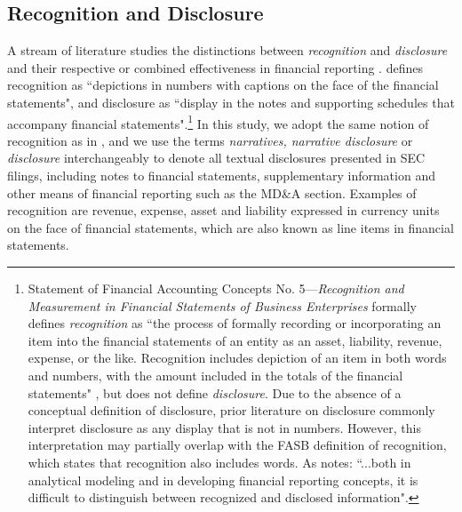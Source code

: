 \documentclass[a4paper]{article}
\begin{document}
\begin{spacing}{2}
\subsection{Recognition and Disclosure}
A stream of literature studies the distinctions between \textit{recognition} and \textit{disclosure} and their respective or combined effectiveness in financial reporting .  defines recognition as ``depictions in numbers with captions on the face of the financial statements", and disclosure as ``display in the notes and supporting schedules that accompany financial statements".\footnote{Statement of Financial Accounting Concepts No. 5---\textit{Recognition and Measurement in Financial Statements of Business Enterprises} formally defines \textit{recognition} as ``the process of formally recording or incorporating an item into the financial statements of an entity as an asset, liability, revenue, expense, or the like. Recognition includes depiction of an item in both words and numbers, with the amount included in the totals of the financial statements" , but does not define \textit{disclosure}. Due to the absence of a conceptual definition of disclosure, prior literature on disclosure commonly interpret disclosure as any display that is not in numbers. However, this interpretation may partially overlap with the FASB definition of recognition, which states that recognition also includes words. As  notes: ``...both in analytical modeling and in developing financial reporting concepts, it is difficult to distinguish between recognized and disclosed information".} In this study, we adopt the same notion of recognition as in , and we use the terms \textit{narratives, narrative disclosure} or \textit{disclosure} interchangeably to denote all textual disclosures presented in SEC filings, including notes to financial statements, supplementary information and other means of financial reporting such as the MD\&A section. Examples of recognition are revenue, expense, asset and liability expressed in currency units on the face of financial statements, which are also known as line items in financial statements. 


\end{spacing}
\end{document}
